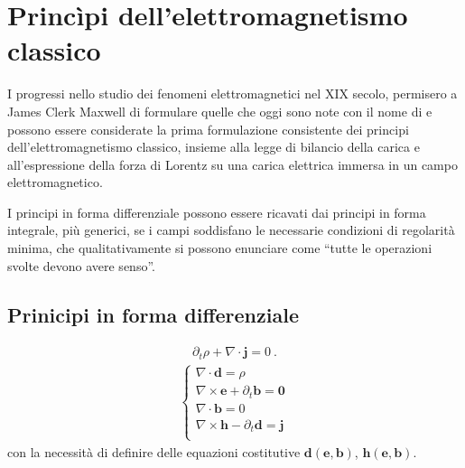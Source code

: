 \documentclass[letterpaper,10pt,english]{jupyterBook}
\begin{document}
\chapter{Princìpi dell’elettromagnetismo classico}
\label{\detokenize{ch/principles:principi-dell-elettromagnetismo-classico}}\label{\detokenize{ch/principles:classical-electromagnetism-principles}}\label{\detokenize{ch/principles::doc}}
\sphinxAtStartPar
I progressi nello studio dei fenomeni elettromagnetici nel XIX secolo, permisero a James Clerk Maxwell di formulare quelle che oggi sono note con il nome di  e possono essere considerate la prima formulazione consistente dei principi dell’elettromagnetismo classico, insieme alla legge di bilancio della carica e all’espressione della forza di Lorentz su una carica elettrica immersa in un campo elettromagnetico.

\sphinxAtStartPar
I principi in forma differenziale possono essere ricavati dai principi in forma integrale, più generici, se i campi soddisfano le necessarie condizioni di regolarità minima, che qualitativamente si possono enunciare come “tutte le operazioni svolte devono avere senso”.


\section{Prinicipi in forma differenziale}
\label{\detokenize{ch/principles:prinicipi-in-forma-differenziale}}
\sphinxAtStartPar
{}
\begin{equation*}
\begin{split}\partial_t \rho + \nabla \cdot \mathbf{j} = 0 \ .\end{split}
\end{equation*}
\sphinxAtStartPar
{}
\begin{equation*}
\begin{split}\begin{cases}
 \nabla \cdot \mathbf{d} = \rho \\
 \nabla \times \mathbf{e} + \partial_t \mathbf{b} = \mathbf{0} \\ 
 \nabla \cdot \mathbf{b} = 0 \\
 \nabla \times \mathbf{h} - \partial_t \mathbf{d} = \mathbf{j} \\
\end{cases}\end{split}
\end{equation*}
\sphinxAtStartPar
con la necessità di definire delle equazioni costitutive \(\mathbf{d}(\mathbf{e}, \mathbf{b})\), \(\mathbf{h}(\mathbf{e}, \mathbf{b})\).
\end{document}
